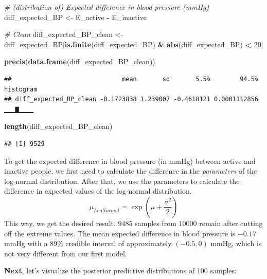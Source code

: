 \documentclass[
]{book}
\newenvironment{Shaded}{\begin{snugshade}}{\end{snugshade}}
\newcommand{\CommentTok}[1]{\textcolor[rgb]{0.56,0.35,0.01}{\textit{#1}}}
\newcommand{\DecValTok}[1]{\textcolor[rgb]{0.00,0.00,0.81}{#1}}
\newcommand{\FunctionTok}[1]{\textcolor[rgb]{0.13,0.29,0.53}{\textbf{#1}}}
\newcommand{\NormalTok}[1]{#1}
\newcommand{\OtherTok}[1]{\textcolor[rgb]{0.56,0.35,0.01}{#1}}
\newcommand{\SpecialCharTok}[1]{\textcolor[rgb]{0.81,0.36,0.00}{\textbf{#1}}}
\begin{document}
\begin{Shaded}
\begin{Highlighting}[]
\CommentTok{\# (distribution of) Expected difference in blood pressure (mmHg)}
\NormalTok{diff\_expected\_BP }\OtherTok{\textless{}{-}}\NormalTok{ E\_active }\SpecialCharTok{{-}}\NormalTok{ E\_inactive}

\CommentTok{\# Clean}
\NormalTok{diff\_expected\_BP\_clean }\OtherTok{\textless{}{-}}\NormalTok{ diff\_expected\_BP[}\FunctionTok{is.finite}\NormalTok{(diff\_expected\_BP) }\SpecialCharTok{\&} 
                                          \FunctionTok{abs}\NormalTok{(diff\_expected\_BP) }\SpecialCharTok{\textless{}} \DecValTok{20}\NormalTok{]}

\FunctionTok{precis}\NormalTok{(}\FunctionTok{data.frame}\NormalTok{(diff\_expected\_BP\_clean))}
\end{Highlighting}
\end{Shaded}

\begin{verbatim}
##                              mean       sd       5.5%        94.5% histogram
## diff_expected_BP_clean -0.1723838 1.239007 -0.4618121 0.0001112856  ▁▁▁▇▁▁▁▁
\end{verbatim}

\begin{Shaded}
\begin{Highlighting}[]
\FunctionTok{length}\NormalTok{(diff\_expected\_BP\_clean) }
\end{Highlighting}
\end{Shaded}

\begin{verbatim}
## [1] 9529
\end{verbatim}

To get the expected difference in blood pressure (in mmHg) between
active and inactive people, we first need to calculate the difference in the
\emph{parameters} of the log-normal distribution.
After that, we use the parameters to calculate the difference
in expected values of the log-normal distribution.
\[ \mu_{LogNormal} = \exp(\mu + \frac{\sigma^2}{2})\]
This way, we get the desired result.
\(9485\) samples from \(10000\) remain after cutting off the extreme values.
The mean expected difference in blood pressure is \(-0.17\) mmHg with a 89\%
credible interval of approximately \((-0.5, 0)\) mmHg, which is not
very different from our first model.

\textbf{Next}, let's visualize the posterior predictive distributions of 100 samples:
\end{document}
